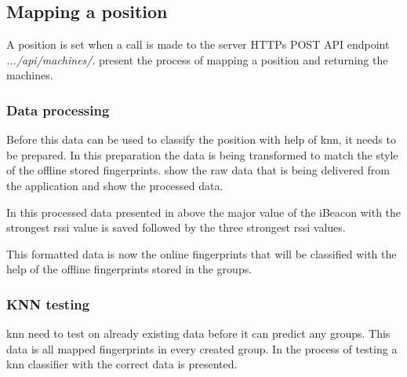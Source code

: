 \subsection{Mapping a position}\label{sec:implServerSetPos}
A position is set when a call is made to the server HTTPs POST API endpoint \textit{.../api/machines/}.
 present the process of mapping a position and returning the machines.


\subsubsection{Data processing}\label{sec:implServerSetPosDataProcessing}
Before this data can be used to classify the position with help of \acrfull{knn}, it needs to be prepared.
In this preparation the data is being transformed to match the style of the offline stored fingerprints.
 show the raw data that is being delivered from the application and  show the processed data.



In this processed data presented in  above the major value of the iBeacon with the strongest \acrshort{rssi} value is saved followed by the three strongest \acrshort{rssi} values.

\bigskip

This formatted data is now the online fingerprints that will be classified with the help of the offline fingerprints stored in the groups.


\subsubsection{KNN testing}\label{sec:implServerSetPosKnnTesting}

\Acrshort{knn} need to test on already existing data before it can predict any groups. 
This data is all mapped fingerprints in every created group.
In  the process of testing a \acrshort{knn} classifier with the correct data is presented.

